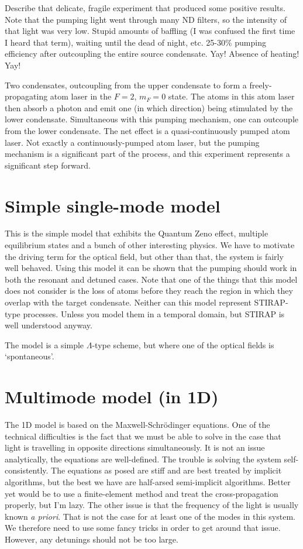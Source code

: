 Describe that delicate, fragile experiment that produced some positive results.  Note that the pumping light went through many ND filters, so the intensity of that light was very low.  Stupid amounts of baffling (I was confused the first time I heard that term), waiting until the dead of night, etc.  25-30\% pumping efficiency after outcoupling the entire source condensate. Yay! Absence of heating! Yay!

Two condensates, outcoupling from the upper condensate to form a freely-propagating atom laser in the $F=2$, $m_F=0$ state.  The atoms in this atom laser then absorb a photon and emit one (in which direction) being stimulated by the lower condensate.  Simultaneous with this pumping mechanism, one can outcouple from the lower condensate.  The net effect is a quasi-continuously pumped atom laser.  Not exactly a continuously-pumped atom laser, but the pumping mechanism is a significant part of the process, and this experiment represents a significant step forward.

\section{Simple single-mode model}
\label{OpticalPumping:SingleModeModel}

This is the simple model that exhibits the Quantum Zeno effect, multiple equilibrium states and a bunch of other interesting physics.  We have to motivate the driving term for the optical field, but other than that, the system is fairly well behaved.  Using this model it can be shown that the pumping should work in both the resonant and detuned cases.  Note that one of the things that this model does not consider is the loss of atoms before they reach the region in which they overlap with the target condensate. Neither can this model represent STIRAP-type processes. Unless you model them in a temporal domain, but STIRAP is well understood anyway.

The model is a simple $\Lambda$-type scheme, but where one of the optical fields is `spontaneous'.

\section{Multimode model (in 1D)}
\label{OpticalPumping:MultimodeModel}

The 1D model is based on the Maxwell-Schrödinger equations.  One of the technical difficulties is the fact that we must be able to solve in the case that light is travelling in opposite directions simultaneously.  It is not an issue analytically, the equations are well-defined.  The trouble is solving the system self-consistently.  The equations as posed are stiff and are best treated by implicit algorithms, but the best we have are half-arsed semi-implicit algorithms. Better yet would be to use a finite-element method and treat the cross-propagation properly, but I'm lazy.  The other issue is that the frequency of the light is usually known \emph{a priori}.  That is not the case for at least one of the modes in this system.  We therefore need to use some fancy tricks in order to get around that issue.  However, any detunings should not be too large.

